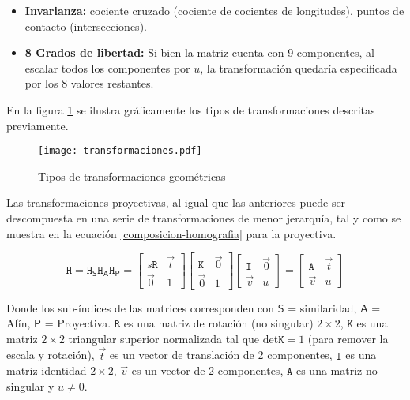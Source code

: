 \begin{itemize}
	\item \textbf{Invarianza:} cociente cruzado (cociente de cocientes de longitudes), puntos de contacto (intersecciones).
	\item \textbf{8 Grados de libertad:} Si bien la matriz cuenta con 9 componentes, al escalar todos los componentes por $u$, la transformación quedaría especificada por los 8 valores restantes.
\end{itemize}
En la figura \ref{imagen:transformaciones} se ilustra gráficamente los tipos de transformaciones descritas previamente.

\begin{figure}[H]
	\centering
	\texttt{[image: transformaciones.pdf]}
	\caption[Tipos de transformaciones geométricas]{Tipos de transformaciones geométricas}
	\label{imagen:transformaciones}
\end{figure}

Las transformaciones proyectivas, al igual que las anteriores puede ser descompuesta en una serie de transformaciones de menor jerarquía, tal y como se muestra en la ecuación \ref{composicion-homografia} para la proyectiva.

\begin{equation}
\mathtt{H} = \mathtt{H}_\mathsf{S} \mathtt{H}_\mathsf{A} \mathtt{H}_\mathsf{P} = 
\begin{bmatrix}
{s\mathtt{R}}&{\vec{t}}\\
{\vec{0}}&{1}
\end{bmatrix}
\begin{bmatrix}
{\mathtt{K}}&{\vec{0}}\\
{\vec{0}}&{1}
\end{bmatrix}
\begin{bmatrix}
{\mathtt{I}}&{\vec{0}}\\
{\vec{v}}&{u}
\end{bmatrix} =
\begin{bmatrix}
{\mathtt{A}}&{\vec{t}}\\
{\vec{v}}&{u}
\end{bmatrix}
\label{composicion-homografia}
\end{equation}

Donde los sub-índices de las matrices corresponden con $\mathsf{S}$ = similaridad, $\mathsf{A}$ = Afín, $\mathsf{P}$ = Proyectiva. $\mathtt{R}$ es una matriz de rotación (no singular) $2\times2$,  $\mathtt{K}$ es una matriz $2\times2$ triangular superior normalizada tal que det$\mathtt{K}=1$ (para remover la escala y rotación), $\vec{t}$ es un vector de translación de 2 componentes, $\mathtt{I}$ es una matriz identidad $2\times2$, $\vec{v}$ es un vector de 2 componentes, $\mathtt{A}$ es una matriz no singular y $u\neq0$.

